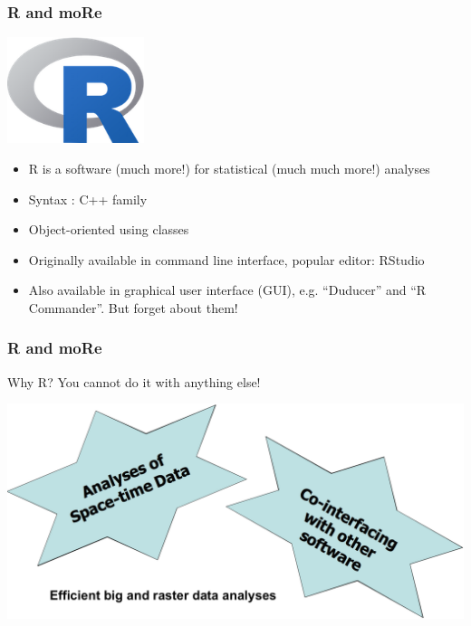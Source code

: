 \documentclass{beamer}
\begin{document}

\begin{frame}
\frametitle{R and moRe}
\centering
\includegraphics[width=0.3\textwidth]{Figures/Rlogo.png}
\pause
\begin{itemize}
\item R is a software (\alert{much more!}) for statistical (\alert{much much more!}) analyses
\pause
\item Syntax : C++ family
\pause
\item Object-oriented using classes
\pause
\item Originally available in command line interface, popular editor: \alert{RStudio}
\pause
\item Also available in graphical user interface (GUI), e.g. ``Duducer'' and ``R Commander''. \alert{But forget about them!}
\end{itemize}
\end{frame}


\begin{frame}
\frametitle{R and moRe}
\begin{block}{Why R?}
You cannot do it with anything else!
\end{block}
\pause
\centering
\includegraphics[width=\textwidth]{Figures/whyR.png}
\end{frame}

\end{document}
